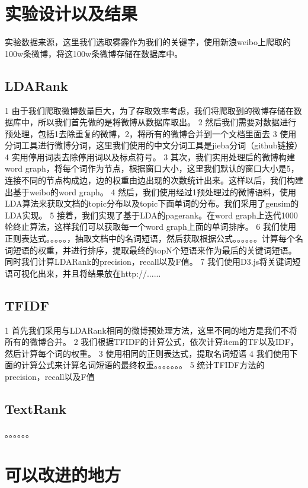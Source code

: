 \documentclass[master]{njuthesis}
\begin{document}
\section{实验设计以及结果}

实验数据来源，这里我们选取雾霾作为我们的关键字，使用新浪weibo上爬取的100w条微博，将这100w条微博存储在数据库中。

\subsection{LDARank}

1 由于我们爬取微博数量巨大，为了存取效率考虑，我们将爬取到的微博存储在数据库中，所以我们首先做的是将微博从数据库取出。
2 然后我们需要对数据进行预处理，包括1去除重复的微博，2，将所有的微博合并到一个文档里面去 3 使用分词工具进行微博分词，这里我们使用的中文分词工具是jieba分词（github链接）4 实用停用词表去除停用词以及标点符号。
3 其次，我们实用处理后的微博构建word graph，将每个词作为节点，根据窗口大小，这里我们默认的窗口大小是5，连接不同的节点构成边，边的权重由边出现的次数统计出来。这样以后，我们构建出基于weibo的word graph。
4 然后，我们使用经过1预处理过的微博语料，使用LDA算法来获取文档的topic分布以及topic下面单词的分布。我们采用了gensim的LDA实现。
5 接着，我们实现了基于LDA的pagerank。在word graph上迭代1000轮终止算法，这样我们可以获取每一个word graph上面的单词排序。
6 我们使用正则表达式。。。。。，抽取文档中的名词短语，然后获取根据公式。。。。。。计算每个名词短语的权重，并进行排序，提取最终的topN个短语来作为最后的关键词短语。同时我们计算LDARank的precision，recall以及F值。
7 我们使用D3.js将关键词短语可视化出来，并且将结果放在http://......

\subsection{TFIDF}

1 首先我们采用与LDARank相同的微博预处理方法，这里不同的地方是我们不将所有的微博合并。
2 我们根据TFIDF的计算公式，依次计算item的TF以及IDF，然后计算每个词的权重。
3 使用相同的正则表达式，提取名词短语
4 我们使用下面的计算公式来计算名词短语的最终权重。。。。。。。
5 统计TFIDF方法的precision，recall以及F值

\subsection{TextRank}
。。。。。。

\section{可以改进的地方}
\end{document}

